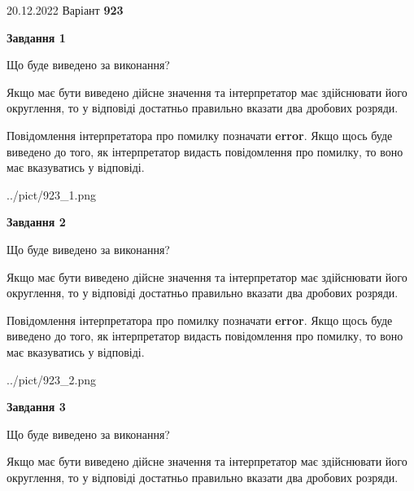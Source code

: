 \documentclass[12pt, ukrainian]{article}
\begin{document}
{20.12.2022 Варіант \No \textbf { 923 }\par}
{
\begin {Large}

{\begin {center}\textbf{Завдання 1}\end {center}}\par
Що буде виведено за виконання? \par

Якщо має бути виведено дійсне значення та інтерпретатор має здійснювати його округлення, 
то у відповіді достатньо правильно вказати два дробових розряди.

Повідомлення інтерпретатора про помилку позначати \textbf{error}.
Якщо щось буде виведено до того, як інтерпретатор видасть повідомлення про помилку, 
то воно має вказуватись у відповіді. \par

\begin{center}
	{../pict/923_1.png}
\end{center}
\newpage

{\begin {center}\textbf{Завдання 2}\end {center}}\par
Що буде виведено за виконання? \par

Якщо має бути виведено дійсне значення та інтерпретатор має здійснювати його округлення, 
то у відповіді достатньо правильно вказати два дробових розряди.

Повідомлення інтерпретатора про помилку позначати \textbf{error}.
Якщо щось буде виведено до того, як інтерпретатор видасть повідомлення про помилку, 
то воно має вказуватись у відповіді. \par

\begin{center}
	{../pict/923_2.png}
\end{center}
\newpage

{\begin {center}\textbf{Завдання 3}\end {center}}\par
Що буде виведено за виконання? \par

Якщо має бути виведено дійсне значення та інтерпретатор має здійснювати його округлення, 
то у відповіді достатньо правильно вказати два дробових розряди.


\end{Large}}
\end{document}
